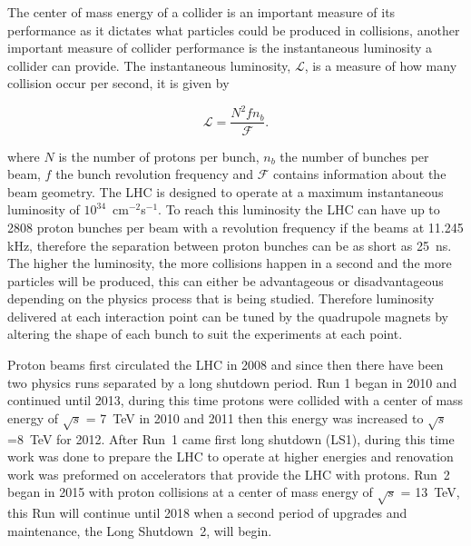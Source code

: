 The center of mass energy of a collider is an important measure of its performance as it dictates what particles could be produced in collisions, another important measure of collider performance is the instantaneous luminosity a collider can provide. The instantaneous luminosity, $\mathcal{L}$, is a measure of how many collision occur per second, it is given by

\begin{equation}
\mathcal{L} = \frac{N^{2} f n_{b}}{\mathcal{F}}.
\label{eq:inst_lumi}
\end{equation}


where $N$ is the number of protons per bunch, $n_{b}$ the number of bunches per beam, $f$ the bunch revolution frequency and $\mathcal{F}$ contains information about the beam geometry. The LHC is designed to operate at a maximum instantaneous luminosity of $10^{34}$~cm$^{-2}$s$^{-1}$. To reach this luminosity the LHC can have up to 2808 proton bunches per beam with a revolution frequency if the beams at 11.245 kHz, therefore the separation between proton bunches can be as short as 25~ns. The higher the luminosity, the more collisions happen in a second and the more particles will be produced, this can either be advantageous or disadvantageous depending on the physics process that is being studied.
Therefore luminosity delivered at each interaction point can be tuned by the quadrupole magnets by altering the shape of each bunch to suit the experiments at each point.

Proton beams first circulated the LHC in 2008 and since then there have been two physics runs separated by a long shutdown period. Run 1 began in 2010 and continued until 2013, during this time protons were collided with a center of mass energy of $\sqrt{s}$ = 7~TeV in 2010 and 2011 then this energy was increased to $\sqrt{s}$ =8~TeV for 2012. After Run~1 came first long shutdown (LS1), during this time work was done to prepare the LHC to operate at higher energies and renovation work was preformed on accelerators that provide the LHC with protons. Run~2 began in 2015 with proton collisions at a center of mass energy of $\sqrt{s}$ =  13~TeV, %
this Run will continue until 2018 when a second period of upgrades and maintenance, the Long Shutdown~2, will begin.




